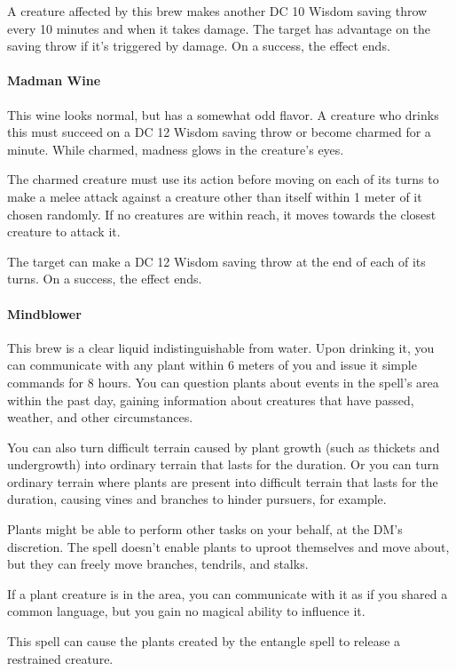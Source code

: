     A creature affected by this brew makes another DC 10 Wisdom saving throw every 10 minutes and when it takes damage.
    The target has advantage on the saving throw if it's triggered by damage.
    On a success, the effect ends.
\paragraph{Madman Wine} %
    This wine looks normal, but has a somewhat odd flavor.
    A creature who drinks this must succeed on a DC 12 Wisdom saving throw or become charmed for a minute.
    While charmed, madness glows in the creature's eyes.

    The charmed creature must use its action before moving on each of its turns to make a melee attack against a creature other than itself within 1 meter of it chosen randomly.
    If no creatures are within reach, it moves towards the closest creature to attack it.

    The target can make a DC 12 Wisdom saving throw at the end of each of its turns.
    On a success, the effect ends.
\paragraph{Mindblower} %
    This brew is a clear liquid indistinguishable from water.
    Upon drinking it, you can communicate with any plant within 6 meters of you and issue it simple commands for 8 hours.
    You can question plants about events in the spell's area within the past day, gaining information about creatures that have passed, weather, and other circumstances.

    You can also turn difficult terrain caused by plant growth (such as thickets and undergrowth) into ordinary terrain that lasts for the duration.
    Or you can turn ordinary terrain where plants are present into difficult terrain that lasts for the duration, causing vines and branches to hinder pursuers, for example.

    Plants might be able to perform other tasks on your behalf, at the DM's discretion. The spell doesn't enable plants to uproot themselves and move about, but they can freely move branches, tendrils, and stalks.

    If a plant creature is in the area, you can communicate with it as if you shared a common language, but you gain no magical ability to influence it.

    This spell can cause the plants created by the entangle spell to release a restrained creature.

